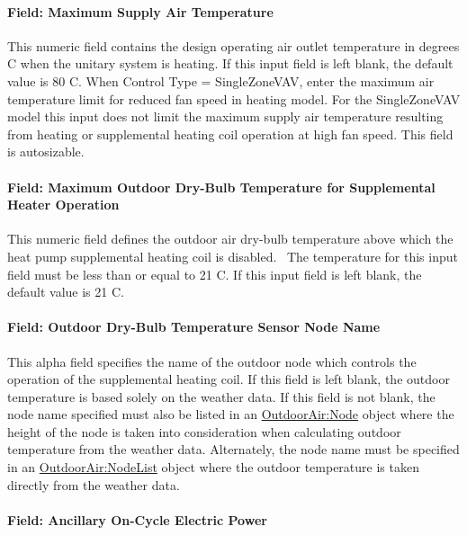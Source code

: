 \paragraph{Field: Maximum Supply Air Temperature}\label{field-maximum-supply-air-temperature-000}

This numeric field contains the design operating air outlet temperature in degrees C when the unitary system is heating. If this input field is left blank, the default value is 80 C. When Control Type = SingleZoneVAV, enter the maximum air temperature limit for reduced fan speed in heating model. For the SingleZoneVAV model this input does not limit the maximum supply air temperature resulting from heating or supplemental heating coil operation at high fan speed.  This field is autosizable.


\paragraph{Field: Maximum Outdoor Dry-Bulb Temperature for Supplemental Heater Operation}\label{field-maximum-outdoor-dry-bulb-temperature-for-supplemental-heater-operation}

This numeric field defines the outdoor air dry-bulb temperature above which the heat pump supplemental heating coil is disabled.~ The temperature for this input field must be less than or equal to 21 C. If this input field is left blank, the default value is 21 C.

\paragraph{Field: Outdoor Dry-Bulb Temperature Sensor Node Name}\label{field-outdoor-dry-bulb-temperature-sensor-node-name}

This alpha field specifies the name of the outdoor node which controls the operation of the supplemental heating coil. If this field is left blank, the outdoor temperature is based solely on the weather data. If this field is not blank, the node name specified must also be listed in an \hyperref[outdoorairnode]{OutdoorAir:Node} object where the height of the node is taken into consideration when calculating outdoor temperature from the weather data. Alternately, the node name must be specified in an \hyperref[outdoorairnodelist]{OutdoorAir:NodeList} object where the outdoor temperature is taken directly from the weather data.

\paragraph{Field: Ancillary On-Cycle Electric Power}\label{field-ancillary-on-cycle-electric-power}

